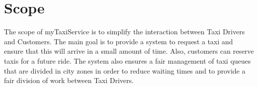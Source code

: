\documentclass[../../../../dd.tex]{subfiles}
\begin{document}
	\section{Scope}
		The scope of myTaxiService is to simplify the interaction between Taxi Drivers and Customers.
		The main goal is to provide a system to request a taxi and ensure that this will arrive in a small amount of time. Also, customers can reserve taxis for a future ride.
		The system also ensures a fair management of taxi queues that are divided in city zones in order to reduce waiting times and to provide a fair division of work between Taxi Drivers.
\end{document}
